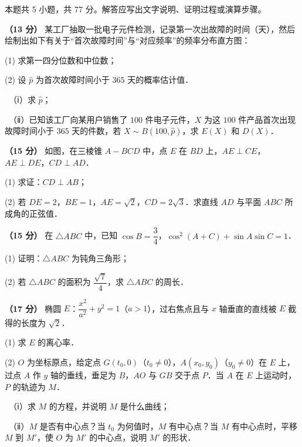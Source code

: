 \begin{gktip}
本题共 5 小题，共 77 分。解答应写出文字说明、证明过程或演算步骤。
\end{gktip}

\Needspace{0.4\textheight}
\begin{question}
\textbf{（13 分）} 某工厂抽取一批电子元件检测，记录第一次出故障的时间（天），然后绘制出如下有关于“首次故障时间”与“对应频率”的频率分布直方图：
\nopagebreak[4]
\begin{center}\end{center}
\nopagebreak[4]
  (1) 求第一四分位数和中位数；

  (2) 设 $\hat{p}$ 为首次故障时间小于 $365$ 天的概率估计值．

  　（ⅰ）求 $\hat{p}$；

  　（ⅱ）已知该工厂向某用户销售了 $100$ 件电子元件，$X$ 为这 $100$ 件产品首次出现故障时间小于 $365$ 天的件数，若 $X\sim B(100,\hat{p})$，求 $E(X)$ 和 $D(X)$．

\Needspace{0.4\textheight}
\end{question}
\begin{question}
\textbf{（15 分）} 如图，在三棱锥 $A-BCD$ 中，点 $E$ 在 $BD$ 上，$AE\perp CE$，$AE\perp DE$，$CD\perp AD$．
\nopagebreak[4]
\begin{center}\end{center}
\nopagebreak[4]
  (1) 求证：$CD\perp AB$；

  (2) 若 $DE=2$，$BE=1$，$AE=\sqrt{2}$，$CD=2\sqrt{3}$．求直线 $AD$ 与平面 $ABC$ 所成角的正弦值．

\end{question}
\begin{question}
\textbf{（15 分）} 在 $\triangle ABC$ 中，已知 $\cos B=\dfrac{3}{4}$，$\cos^2(A+C)+\sin A\sin C=1$．

  (1) 证明：$\triangle ABC$ 为钝角三角形；

  (2) 若 $\triangle ABC$ 的面积为 $\dfrac{\sqrt{7}}{4}$，求 $\triangle ABC$ 的周长．

\end{question}
\begin{question}
\textbf{（17 分）} 椭圆 $E$：$\dfrac{x^2}{a^2}+y^2=1$（$a>1$），过右焦点且与 $x$ 轴垂直的直线被 $E$ 截得的长度为 $\sqrt{2}$．

  (1) 求 $E$ 的离心率．

  (2) $O$ 为坐标原点，给定点 $G(t_0,0)$（$t_0\ne0$），$A(x_0,y_0)$（$y_0\ne0$）在 $E$ 上，过点 $A$ 作 $y$ 轴的垂线，垂足为 $B$，$AO$ 与 $GB$ 交于点 $P$．当 $A$ 在 $E$ 上运动时，$P$ 的轨迹为 $M$．

  　（ⅰ）求 $M$ 的方程，并说明 $M$ 是什么曲线；

  　（ⅱ）$M$ 是否有中心点？当 $t_0$ 为何值时，$M$ 有中心点？当 $M$ 有中心点时，平移 $M$ 到 $M'$，使 $O$ 为 $M'$ 的中心点，说明 $M'$ 的形状．

\end{question}
